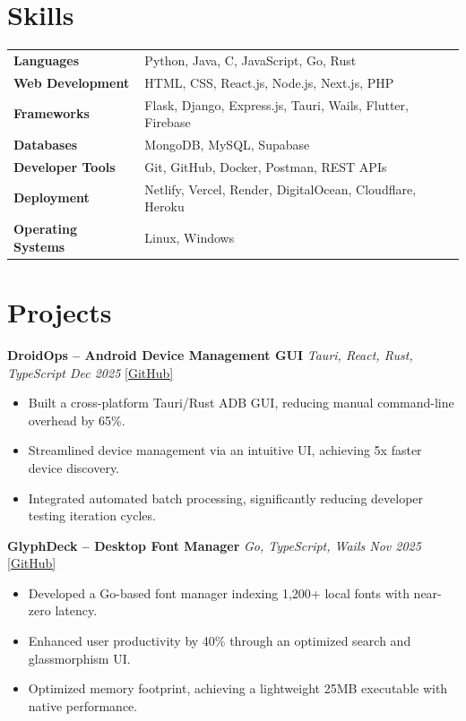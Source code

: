 \documentclass[10pt, a4paper]{article}
\begin{document}
\section*{Skills}

\renewcommand{\arraystretch}{1.05}
\begin{tabular}{@{} >{\bfseries}p{3.8cm} p{13cm} @{}}
Languages           & Python, Java, C, JavaScript, Go, Rust \\
Web Development     & HTML, CSS, React.js, Node.js, Next.js, PHP \\
Frameworks          & Flask, Django, Express.js, Tauri, Wails, Flutter, Firebase \\
Databases           & MongoDB, MySQL, Supabase \\
Developer Tools     & Git, GitHub, Docker, Postman, REST APIs \\
Deployment          & Netlify, Vercel, Render, DigitalOcean, Cloudflare, Heroku \\
Operating Systems   & Linux, Windows \\
\end{tabular}

\section*{Projects}

\textbf{DroidOps -- Android Device Management GUI} \hfill \textit{Tauri, React, Rust, TypeScript \quad Dec 2025} \quad \href{https://github.com/bbinxx/droidops}{[GitHub]}
\begin{itemize}
\item Built a cross-platform Tauri/Rust ADB GUI, reducing manual command-line overhead by 65\%.
\item Streamlined device management via an intuitive UI, achieving 5x faster device discovery.
\item Integrated automated batch processing, significantly reducing developer testing iteration cycles.
\end{itemize}

\vspace{3pt}

\textbf{GlyphDeck -- Desktop Font Manager} \hfill \textit{Go, TypeScript, Wails \quad Nov 2025} \quad \href{https://github.com/bbinxx/GlyphDeck}{[GitHub]}
\begin{itemize}
\item Developed a Go-based font manager indexing 1,200+ local fonts with near-zero latency.
\item Enhanced user productivity by 40\% through an optimized search and glassmorphism UI.
\item Optimized memory footprint, achieving a lightweight 25MB executable with native performance.
\end{itemize}
\end{document}
